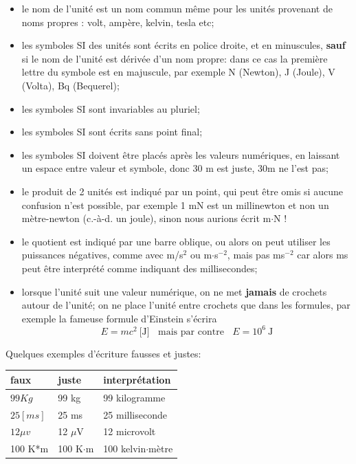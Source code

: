 \begin{itemize}

    \item le nom de l'unité est un nom commun même pour les unités provenant de noms propres : volt, ampère, kelvin, tesla etc;
    \item les symboles SI des unités sont écrits en police droite, et en minuscules, \textbf{sauf} si le nom de l'unité est dérivée d'un nom propre: dans ce cas la première lettre du symbole est en majuscule, par exemple N (Newton), J (Joule), V (Volta), Bq (Bequerel);
    \item les symboles SI sont invariables au pluriel;
    \item les symboles SI sont écrits sans point final;
    \item les symboles SI doivent être placés après les valeurs numériques, en laissant un espace entre valeur et symbole, donc 30 m est juste, 30m ne l'est pas;
    \item le produit de 2 unités est indiqué par un point, qui peut être omis si aucune confusion n'est possible, par exemple 1 mN est un millinewton et non un mètre-newton (c.-à-d. un joule), sinon nous aurions écrit m$\cdot$N !
    \item le quotient est indiqué par une barre oblique, ou alors on peut utiliser les puissances négatives, comme avec m/s$^2$ ou m$\cdot$s$^{-2}$, mais pas ms$^{-2}$ car alors ms peut être interprété comme indiquant des millisecondes;
    \item lorsque l'unité suit une valeur numérique, on ne met \textbf{jamais} de crochets autour de l'unité; on ne place l'unité entre crochets que dans les formules, par exemple la fameuse formule d'Einstein s'écrira
          $$
              E=mc^2\ \text{[J]}\ \ \ \ \text{mais par contre}\ \ \ \ E=10^6\ \text{J}
          $$
\end{itemize}
Quelques exemples d'écriture  fausses et justes:

\begin{center}
    \begin{tabular}{lll}
        faux       & juste         & interprétation         \\\hline
        $99Kg$     & 99 kg         & 99 kilogramme          \\
        $25 [ms]$  & 25 ms         & 25 milliseconde        \\
        $12 \mu v$ & 12 $\mu$V     & 12 microvolt           \\
        100 K*m    & 100 K$\cdot$m & 100 kelvin$\cdot$mètre \\\hline
    \end{tabular}
\end{center}
